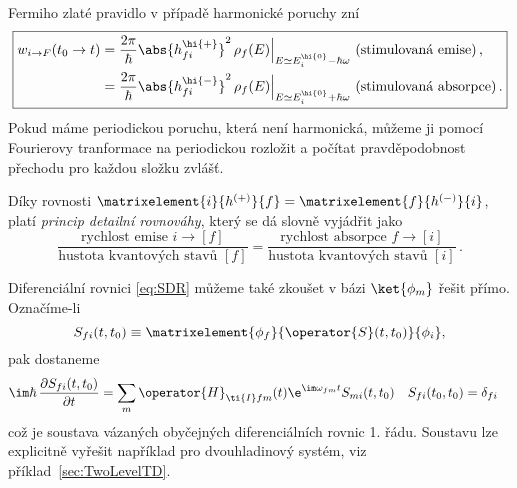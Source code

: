 Fermiho zlaté pravidlo v případě harmonické poruchy zní
\begin{equation}\label{eq:FermiGoldenRuleHarmonic}
    \boxed{
        \begin{aligned}
            w_{i\rightarrow F}(t_{0}\rightarrow t)
                &=\frac{2\pi}{\hbar}\abs{h_{fi}^{\hi{+}}}^{2}\,\rho_{f}(E)
                    \Big\vert_{E\simeq E_{i}^{\hi{0}}-\hbar\omega}\text{ (stimulovaná emise)}\,,\\
                &=\frac{2\pi}{\hbar}\abs{h_{fi}^{\hi{-}}}^{2}\,\rho_{f}(E)
                    \Big\vert_{E\simeq E_{i}^{\hi{0}}+\hbar\omega}\text{ (stimulovaná absorpce)}\,.
        \end{aligned}
    }
\end{equation}
Pokud máme periodickou poruchu, která není harmonická, můžeme ji pomocí Fourierovy tranformace na periodickou rozložit a počítat pravděpodobnost přechodu pro každou složku zvlášť.

Díky rovnosti $\matrixelement{i}{h^{(+)}}{f}=\matrixelement{f}{h^{(-)}}{i}$, platí 
\emph{princip detailní rovnováhy}, který se dá slovně vyjádřit jako
\begin{equation}
    \frac{{\text{rychlost emise }}i\rightarrow [f]}{{\text{hustota kvantových stavů }}[f]}
        =\frac{{\text{rychlost absorpce }}f\rightarrow [i]}
            {{\text{hustota kvantových stavů }}[i]}\,.
\end{equation}

\note
Diferenciální rovnici \eqref{eq:SDR} můžeme také zkoušet v bázi $\ket{\phi_{m}}$ řešit přímo.
Označíme-li
\begin{equation}
    S_{fi}(t,t_{0})\equiv\matrixelement{\phi_{f}}{\operator{S}(t,t_{0})}{\phi_{i}},
\end{equation}
pak dostaneme
\begin{align}
\im\hbar\,\frac{\partial S_{fi}(t,t_{0})}{\partial t}
    &=\sum_{m}\operator{H}_{\ti{I}fm}(t)\e^{\im\omega_{fm}t}S_{mi}(t,t_{0})
    & S_{fi}(t_{0},t_{0})&=\delta_{fi}
\end{align}
což je soustava vázaných obyčejných diferenciálních rovnic 1. řádu.
Soustavu lze explicitně vyřešit například pro dvouhladinový systém, viz příklad~\ref{sec:TwoLevelTD}.

